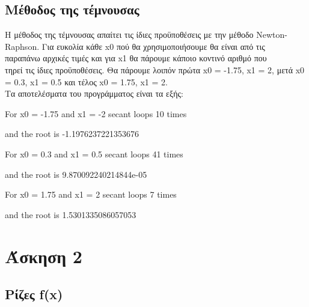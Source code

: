 \documentclass[a4paper,11pt]{article}
\newcommand{\lt}{\latintext}
\newcommand{\gt}{\greektext}
\begin{document}
	\subsection{Μέθοδος της τέμνουσας}
		\normalsize{Η μέθοδος της τέμνουσας απαίτει τις ίδιες
προϋποθέσεις με την μέθοδο \lt Newton-Raphson. \gt Για ευκολία κάθε
\lt x0 \gt πού θα χρησιμοποιήσουμε θα είναι από τις \\παραπάνω
αρχικές τιμές και για \lt x1 \gt θα πάρουμε κάποιο κοντινό αριθμό που
\\ τηρεί τις ίδιες προϋποθέσεις. Θα πάρουμε λοιπόν πρώτα 
\lt x0 = -1.75, x1 = 2, \gt μετά \lt x0 = 0.3, x1 = 0.5 \gt 
και τέλος \lt x0 = 1.75, x1 = 2. \gt \\
Τα αποτελέσματα του προγράμματος είναι τα εξής: \par\lt
\par For x0 = -1.75 and x1 = -2 secant loops 10 times 
\par and the root is -1.1976237221353676
\par For x0 = 0.3 and x1 = 0.5 secant loops 41 times 
\par and the root is 9.870092240214844e-05
\par For x0 =  1.75 and x1 =  2 secant loops 7 times 
\par and the root is 1.5301335086057053}
		
\vspace*{7 cm}
\section{Άσκηση 2}
	\subsection{Ρίζες \lt f(x)}
\end{document}
